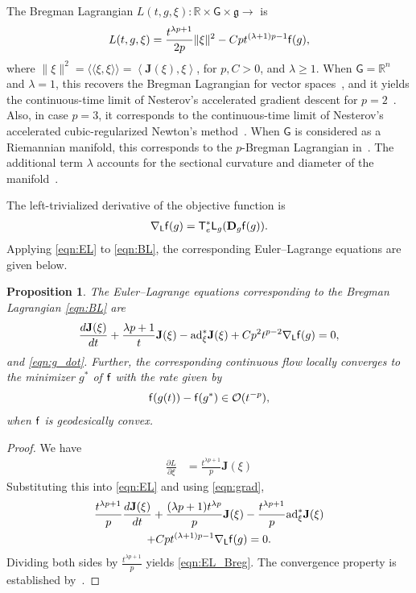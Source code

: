 \documentclass[letterpaper, 10pt, conference]{ieeeconf}
\newcommand{\deriv}[2]{\ensuremath{\frac{\partial #1}{\partial #2}}}
\newcommand{\G}{\ensuremath{\mathsf{G}}}
\newcommand{\T}{\ensuremath{\mathsf{T}}}
\renewcommand{\L}{\ensuremath{\mathsf{L}}}
\renewcommand{\Re}{\ensuremath{\mathbb{R}}}
\newcommand{\D}{\ensuremath{\mathbf{D}}}
\newcommand{\pair}[1]{\ensuremath{\left\langle #1 \right\rangle}}
\newcommand{\met}[1]{\ensuremath{\langle\!\langle #1 \rangle\!\rangle}}
\newcommand{\ad}{\ensuremath{\mathrm{ad}}}
\newcommand{\g}{\ensuremath{\mathfrak{g}}}
\newtheorem{prop}{Proposition}
\begin{document}
The Bregman Lagrangian $L(t,g,\xi):\Re\times\G\times\g\rightarrow$ is %
\begin{align}
    L(t,g,\xi) = \frac{t^{\lambda p+1}}{2p} \|\xi\|^2 - C p t^{(\lambda+1)p-1} \mathsf{f} (g),\label{eqn:BL}
\end{align}
where $\|\xi\|^2 = \met{\xi,\xi}=\pair{\mathbf{J}(\xi),\xi}$, for $p, C>0$, and $\lambda\geq 1$.
When $\G=\Re^n$ and $\lambda=1$, this recovers the Bregman Lagrangian for vector spaces~\cite{wibisono2016variational}, and it yields the continuous-time limit of Nesterov's accelerated gradient descent for $p=2$~\cite{nesterov2005smooth}.
Also, in case $p = 3$, it corresponds to the continuous-time limit of Nesterov’s accelerated cubic-regularized Newton’s method~\cite{nesterov2008accelerating}.
When $\G$ is considered as a Riemannian manifold, this corresponds to the $p$-Bregman Lagrangian in~\cite{duruisseaux2021variational}.
The additional term $\lambda$ accounts for the sectional curvature and diameter of the manifold~\cite{alimisis2020continuous}. 

The left-trivialized derivative of the objective function is
\begin{align}
    \nabla_\L \obj(g) = \T_e^*\L_g (\D_g \obj(g)).\label{eqn:grad}
\end{align}
Applying \eqref{eqn:EL} to \eqref{eqn:BL}, the corresponding Euler--Lagrange equations are given below.
\begin{prop}\label{prop:EL_Breg}
    The Euler--Lagrange equations corresponding to the Bregman Lagrangian \eqref{eqn:BL} are%
    \begin{align}
        \frac{d \mathbf{J}(\xi)}{dt} + \frac{\lambda p+1}{t}\mathbf{J}(\xi) - \ad^*_\xi \mathbf{J}(\xi)
        + Cp^2 t^{p-2} \nabla_\L \obj (g) =0, \label{eqn:EL_Breg}
    \end{align}
    and \eqref{eqn:g_dot}. 
    Further, the corresponding continuous flow locally converges to the minimizer $g^*$ of $\mathsf{f}$ with the rate given by
    \begin{align}
        \mathsf{f}(g(t)) - \mathsf{f}(g^*) \in \mathcal{O}(t^{-p}),
    \end{align}
    when $\mathsf{f}$ is geodesically convex. 
\end{prop}
\begin{proof}
    We have
    \begin{align*}
        \deriv{L}{\xi} & = \frac{t^{\lambda p+1}}{p}\mathbf{J}(\xi)
    \end{align*}
    Substituting this into \eqref{eqn:EL} and using \eqref{eqn:grad}, 
    \begin{gather*}
        \frac{t^{\lambda p+1}}{p}\frac{d \mathbf{J}(\xi)}{dt} + \frac{(\lambda p+1)t^{\lambda p}}{p}\mathbf{J}(\xi) -\frac{t^{\lambda p+1}}{p} \ad^*_\xi \mathbf{J}(\xi) \\
        + Cpt^{(\lambda +1)p-1} \nabla_\L \obj(g) =0.
    \end{gather*}
    Dividing both sides by $\frac{t^{\lambda p+1}}{p}$ yields \eqref{eqn:EL_Breg}.
    The convergence property is established by~\cite[Theorem 3.2]{duruisseaux2021variational}.
\end{proof}
\end{document}

